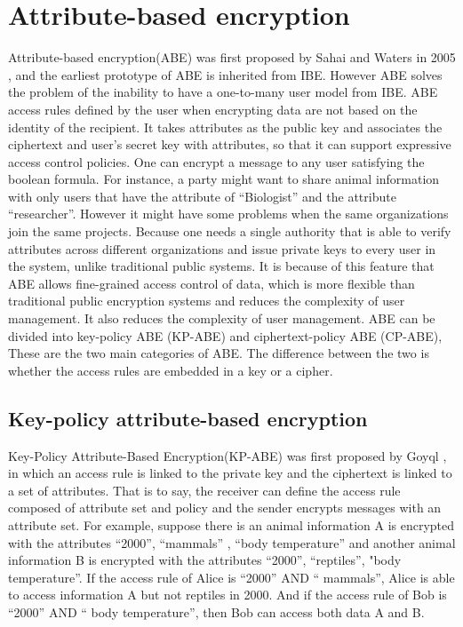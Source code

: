 \documentclass[12pt]{article}
\begin{document}
\section{Attribute-based encryption}
Attribute-based encryption(ABE) was first proposed by Sahai and Waters in 2005 \cite{SW:05}, and the earliest prototype of ABE is inherited from IBE. However ABE solves the problem of the inability to have a one-to-many user model from IBE. ABE access rules defined by the user when encrypting data are not based on the identity of the recipient. It takes attributes as the public key and associates the ciphertext and user’s secret key with attributes, so that it can support expressive access control policies.  One can encrypt a message to any user satisfying the boolean formula. For instance, a party might want to share animal information with only users that have the attribute of  “Biologist” and the attribute “researcher”.  However it might have some problems when the same organizations join the same projects. Because one needs a single authority that is able to verify attributes across different organizations and issue private keys to every user in the system, unlike traditional public systems. It is because of this feature that ABE allows fine-grained access control of data, which is more flexible than traditional public encryption systems and reduces the complexity of user management. It also reduces the complexity of user management. ABE can be divided into key-policy ABE (KP-ABE) and ciphertext-policy ABE (CP-ABE), These are the two main categories of ABE. The difference between the two is whether the access rules are embedded in a key or a cipher.

\subsection{Key-policy attribute-based encryption}
Key-Policy Attribute-Based Encryption(KP-ABE) was first proposed by Goyql \cite{GPSW:06}, in which an access rule is linked to the private key and the ciphertext is linked to a set of attributes. That is to say, the receiver can define the access rule composed of attribute set and policy and the sender encrypts messages with an attribute set. For example, suppose there is an animal information A is encrypted with the attributes {“2000”, “mammals” , “body temperature”} and another animal information B is encrypted with the attributes {“2000”, “reptiles”, "body temperature”}. If the access rule of Alice is “2000” AND “ mammals”, Alice is able to access  information A but not reptiles in 2000. And if the access rule of Bob is “2000” AND “ body temperature”, then Bob can access both data A and B.
\end{document}
